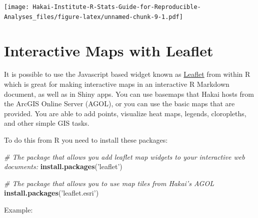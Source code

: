 \documentclass[]{book}
\newenvironment{Shaded}{\begin{snugshade}}{\end{snugshade}}
\newcommand{\KeywordTok}[1]{\textcolor[rgb]{0.13,0.29,0.53}{\textbf{#1}}}
\newcommand{\DataTypeTok}[1]{\textcolor[rgb]{0.13,0.29,0.53}{#1}}
\newcommand{\DecValTok}[1]{\textcolor[rgb]{0.00,0.00,0.81}{#1}}
\newcommand{\FloatTok}[1]{\textcolor[rgb]{0.00,0.00,0.81}{#1}}
\newcommand{\StringTok}[1]{\textcolor[rgb]{0.31,0.60,0.02}{#1}}
\newcommand{\CommentTok}[1]{\textcolor[rgb]{0.56,0.35,0.01}{\textit{#1}}}
\newcommand{\OperatorTok}[1]{\textcolor[rgb]{0.81,0.36,0.00}{\textbf{#1}}}
\newcommand{\NormalTok}[1]{#1}
\begin{document}
\texttt{[image: Hakai-Institute-R-Stats-Guide-for-Reproducible-Analyses\_files/figure-latex/unnamed-chunk-9-1.pdf]}

\section{Interactive Maps with
Leaflet}\label{interactive-maps-with-leaflet}

It is possible to use the Javascript based widget known as
\href{https://rstudio.github.io/leaflet/}{Leaflet} from within R which
is great for making interactive maps in an interactive R Markdown
document, as well as in Shiny apps. You can use basemaps that Hakai
hosts from the ArcGIS Online Server (AGOL), or you can use the basic
maps that are provided. You are able to add points, visualize heat maps,
legends, cloropleths, and other simple GIS tasks.

To do this from R you need to install these packages:

\begin{Shaded}
\begin{Highlighting}[]
\CommentTok{# The package that allows you add leaflet map widgets to your interactive web documents:}
\KeywordTok{install.packages}\NormalTok{(}\StringTok{'leaflet'}\NormalTok{)}

\CommentTok{# The package that allows you to use map tiles from Hakai's AGOL}
\KeywordTok{install.packages}\NormalTok{(}\StringTok{'leaflet.esri'}\NormalTok{)}
\end{Highlighting}
\end{Shaded}

Example:

\begin{Shaded}
\end{Shaded}
\end{document}
